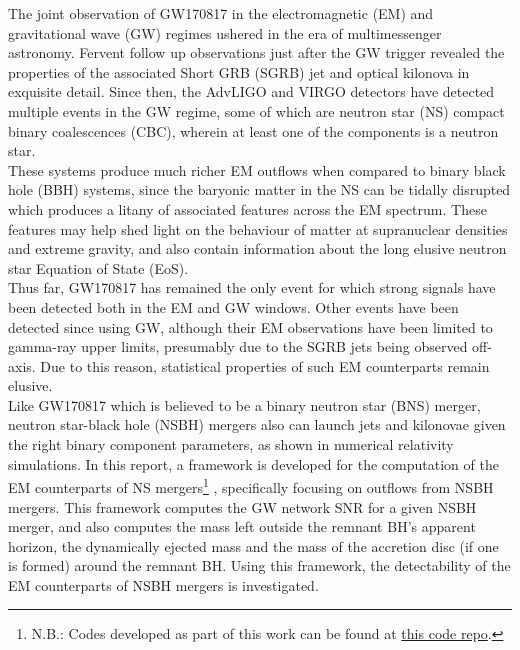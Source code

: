 The joint observation of GW170817 in the electromagnetic (EM) and
gravitational wave (GW) regimes ushered in the era of multimessenger astronomy. Fervent follow
up observations just after the GW trigger revealed the properties of the associated
Short GRB (SGRB) jet and optical kilonova in exquisite detail. Since then, the AdvLIGO and VIRGO
detectors have detected multiple events in the GW regime, some of which are neutron star
(NS) compact binary coalescences (CBC), wherein at least one of the components is a
neutron star.\\
These systems produce much richer EM outflows when compared to binary black hole (BBH)
systems, since the baryonic matter in the NS can be tidally disrupted which produces a
litany of associated features across the EM spectrum. These features may help shed light
on the behaviour of matter at supranuclear densities and extreme gravity, and also
contain information about the long elusive neutron star Equation of State (EoS).\\
Thus far, GW170817 has remained the only event for which strong signals have been
detected both in the EM and GW windows. Other events have been detected since using GW,
although their EM observations have been limited to gamma-ray upper limits, presumably due
to the SGRB jets being observed off-axis. Due to this reason, statistical properties of such EM
counterparts remain elusive.\\
Like GW170817 which is believed to be a binary neutron star (BNS) merger, neutron
star-black hole (NSBH) mergers also can launch jets and kilonovae given the right binary
component parameters, as shown in numerical relativity simulations. In this report, a
framework is developed for the computation of the EM counterparts of NS mergers\footnote
{
    N.B.: Codes developed as part of this work can be found at
    \href{https://github.com/BSGalvan/nsbh-codes}{this code repo}.
}
, specifically focusing on outflows from NSBH mergers. This framework computes the
GW network SNR for a given NSBH merger, and also computes the mass left outside the
remnant BH's apparent horizon, the dynamically ejected mass and the mass of the
accretion disc (if one is formed) around the remnant BH. Using this framework, the
detectability of the EM counterparts of NSBH mergers is investigated.
